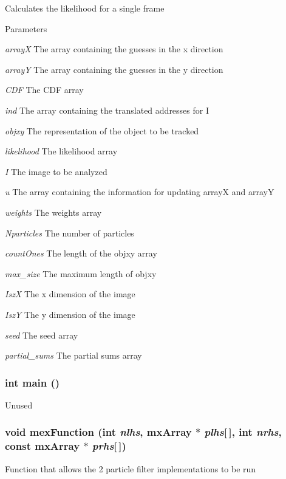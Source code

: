\label{ex__particle__CUDA__float_8cu_afd684a13a1604838afc867cdfe5b3c37}
Calculates the likelihood for a single frame 
\begin{DoxyParams}{Parameters}
\item[{\em arrayX}]The array containing the guesses in the x direction \item[{\em arrayY}]The array containing the guesses in the y direction \item[{\em CDF}]The CDF array \item[{\em ind}]The array containing the translated addresses for I \item[{\em objxy}]The representation of the object to be tracked \item[{\em likelihood}]The likelihood array \item[{\em I}]The image to be analyzed \item[{\em u}]The array containing the information for updating arrayX and arrayY \item[{\em weights}]The weights array \item[{\em Nparticles}]The number of particles \item[{\em countOnes}]The length of the objxy array \item[{\em max\_\-size}]The maximum length of objxy \item[{\em IszX}]The x dimension of the image \item[{\em IszY}]The y dimension of the image \item[{\em seed}]The seed array \item[{\em partial\_\-sums}]The partial sums array \end{DoxyParams}
\hypertarget{ex__particle__CUDA__float_8cu_ae66f6b31b5ad750f1fe042a706a4e3d4}{
\subsubsection[{main}]{\setlength{\rightskip}{0pt plus 5cm}int main ()}}
\label{ex__particle__CUDA__float_8cu_ae66f6b31b5ad750f1fe042a706a4e3d4}
Unused \hypertarget{ex__particle__CUDA__float_8cu_a6a215cbfde54f82a3ce599228fc3fce5}{
\subsubsection[{mexFunction}]{\setlength{\rightskip}{0pt plus 5cm}void mexFunction (int {\em nlhs}, \/  mxArray $\ast$ {\em plhs}\mbox{[}$\,$\mbox{]}, \/  int {\em nrhs}, \/  const mxArray $\ast$ {\em prhs}\mbox{[}$\,$\mbox{]})}}
\label{ex__particle__CUDA__float_8cu_a6a215cbfde54f82a3ce599228fc3fce5}
Function that allows the 2 particle filter implementations to be run

